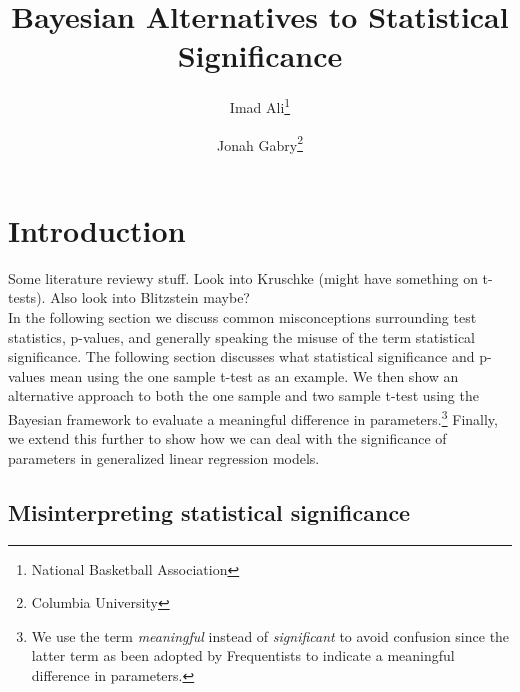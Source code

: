 \documentclass[12pt]{article}
\title{Bayesian Alternatives to Statistical Significance}
\author{Imad Ali\thanks{National Basketball Association} \and Jonah Gabry\thanks{Columbia University}}
\begin{document}
\maketitle
{}
\tableofcontents
\newpage

\def\ci{\perp\!\!\!\perp}
\def\ex{\mathbb{E}}
\def\prob{\mathbb{P}}
\def\ind{\mathbb{I}}
\def\grad{\triangledown}
\def\bigo{\mathcal{O}}

\section{Introduction}

Some literature reviewy stuff. Look into Kruschke (might have something on t-tests). Also look into Blitzstein maybe? \\

\noindent In the following section we discuss common misconceptions surrounding test statistics, p-values, and generally speaking the misuse of the term statistical significance. The following section discusses what statistical significance and p-values mean using the one sample t-test as an example. We then show an alternative approach to both the one sample and two sample t-test using the Bayesian framework to evaluate a meaningful difference in parameters.\footnote{We use the term \emph{meaningful} instead of \emph{significant} to avoid confusion since the latter term as been adopted by Frequentists to indicate a meaningful difference in parameters.} Finally, we extend this further to show how we can deal with the significance of parameters in generalized linear regression models. \\

\subsection{Misinterpreting statistical significance}
\end{document}
